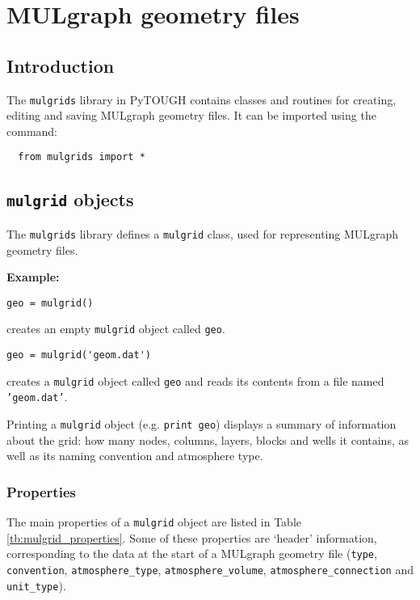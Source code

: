 \chapter{MULgraph geometry files}
\label{mulgrids}

\section{Introduction}
The \texttt{mulgrids} library in PyTOUGH contains classes and routines for creating, editing and saving MULgraph geometry files.  It can be imported using the command:

\begin{lstlisting}
  from mulgrids import *
\end{lstlisting}

\section{\texttt{mulgrid} objects}

The \texttt{mulgrids} library defines a \texttt{mulgrid} class, used for representing MULgraph geometry files.

\textbf{Example:}

\begin{lstlisting}
geo = mulgrid()
\end{lstlisting}

creates an empty \texttt{mulgrid} object called \texttt{geo}.

\begin{lstlisting}
geo = mulgrid('geom.dat')
\end{lstlisting}

creates a \texttt{mulgrid} object called \texttt{geo} and reads its contents from a file named \texttt{'geom.dat'}.

Printing a \texttt{mulgrid} object (e.g. \texttt{print geo}) displays a summary of information about the grid: how many nodes, columns, layers, blocks and wells it contains, as well as its naming convention and atmosphere type.

\subsection{Properties}

The main properties of a \texttt{mulgrid} object are listed in Table \ref{tb:mulgrid_properties}.  Some of these properties are `header' information, corresponding to the data at the start of a MULgraph geometry file (\texttt{type}, \texttt{convention}, \texttt{atmosphere\_type}, \texttt{atmosphere\_volume}, \texttt{atmosphere\_connection} and \texttt{unit\_type}).

